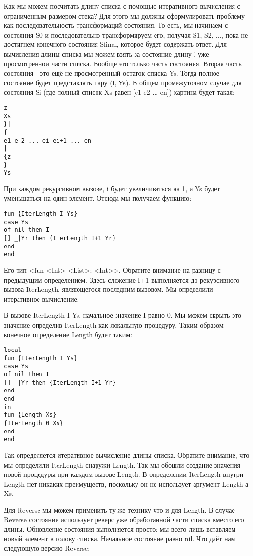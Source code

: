 Как мы можем посчитать длину списка с помощью итеративного вычисления с ограниченным размером стека? Для этого мы должны сформулировать проблему как последовательность трансформаций состояния. То есть, мы начинаем с состояния S0 и последовательно трансформируем его, получая S1, S2, ..., пока не достигнем конечного состояния Sfinal, которое будет содержать ответ. Для вычисления длины списка мы можем взять за состояние длину i уже просмотренной части списка. Вообще это только часть состояния. Вторая часть состояния - это ещё не просмотренный остаток списка Ys. Тогда полное состояние будет представлять пару (i, Ys). В общем промежуточном случае для состояния Si (где полный список Xs равен [e1 e2 ... en]) картина будет такая:

\begin{lstlisting}
z
Xs
}|
{
e1 e 2 ... ei ei+1 ... en
|
{z
}
Ys
\end{lstlisting}

При каждом рекурсивном вызове, i будет увеличиваться на 1, а Ys будет уменьшаться на один элемент. Отсюда мы получаем функцию:

\begin{lstlisting}
fun {IterLength I Ys}
case Ys
of nil then I
[] _|Yr then {IterLength I+1 Yr}
end
end
\end{lstlisting}

Его тип <fun { <Int> <List>}: <Int>>. Обратите внимание на разницу с предыдущим определением. Здесь сложение I+1 выполняется до рекурсивного вызова IterLength, являющегося последним вызовом. Мы определили итеративное вычисление.

В вызове {IterLength I Ys}, начальное значение I равно 0. Мы можем скрыть это значение определив IterLength как локальную процедуру. Таким образом конечное определение Length будет таким:

\begin{lstlisting}
local
fun {IterLength I Ys}
case Ys
of nil then I
[] _|Yr then {IterLength I+1 Yr}
end
end
in
fun {Length Xs}
{IterLength 0 Xs}
end
end
\end{lstlisting}

Так определяется итеративное вычисление длины списка. Обратите внимание, что мы определили IterLength снаружи Length. Так мы обошли создание значения новой процедуры при каждом вызове Length. В определении IterLength внутри Length нет никаких преимуществ, поскольку он не использует аргумент Length-а Xs.

Для Reverse мы можем применить ту же технику что и для Length. В случае Reverse состояние использует реверс уже обработанной части списка вместо его длины. Обновление состояния выполняется просто: мы всего лишь вставляем новый элемент в голову списка. Начальное состояние равно nil. Что даёт нам следующую версию Reverse:

